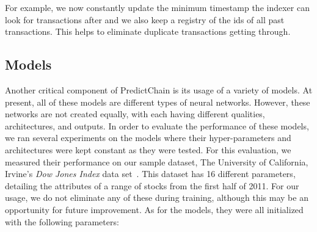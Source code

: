 \documentclass{article}
\begin{document}
    For example, we now constantly update the minimum timestamp the indexer can look for transactions after and we also
    keep a registry of the ids of all past transactions.  This helps to eliminate duplicate transactions getting through.

    \subsection{Models}

    Another critical component of PredictChain is its usage of a variety of models.  At present, all of these models
    are different types of neural networks.  However, these networks are not created equally, with each having different
    qualities, architectures, and outputs.  In order to evaluate the performance of these models, we ran several experiments
    on the models where their hyper-parameters and architectures were kept constant as they were tested.  For this
    evaluation, we measured their performance on our sample dataset, The University of California, Irvine's \textit{Dow Jones
    Index} data set~\cite{dowJones}.  This dataset has 16 different parameters, detailing the attributes of a range of
    stocks from the first half of 2011.  For our usage, we do not eliminate any of these during training, although this
    may be an opportunity for future improvement.  As for the models, they were all initialized with the following parameters:
\end{document}
